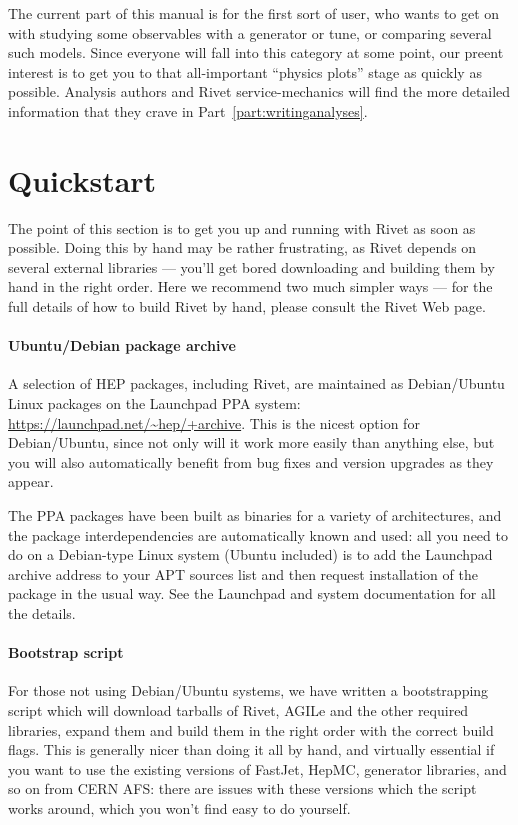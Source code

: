 \documentclass{JHEP3}
\begin{document}
The current part of this manual is for the first sort of user, who wants to get
on with studying some observables with a generator or tune, or comparing several
such models. Since everyone will fall into this category at some point, our
preent interest is to get you to that all-important ``physics plots'' stage as
quickly as possible. Analysis authors and Rivet service-mechanics will find the
more detailed information that they crave in Part~\ref{part:writinganalyses}.


\section{Quickstart}

The point of this section is to get you up and running with Rivet as soon as
possible. Doing this by hand may be rather frustrating, as Rivet depends on
several external libraries --- you'll get bored downloading and building them by
hand in the right order. Here we recommend two much simpler ways --- for the
full details of how to build Rivet by hand, please consult the Rivet Web page.


\paragraph{Ubuntu/Debian package archive}

A selection of HEP packages, including Rivet, are maintained as Debian/Ubuntu
Linux packages on the Launchpad PPA system:
\url{https://launchpad.net/~hep/+archive}. This is the nicest option for
Debian/Ubuntu, since not only will it work more easily than anything else, but
you will also automatically benefit from bug fixes and version upgrades as they
appear.

The PPA packages have been built as binaries for a variety of architectures, and
the package interdependencies are automatically known and used: all you need to
do on a Debian-type Linux system (Ubuntu included) is to add the Launchpad
archive address to your APT sources list and then request installation of the
 package in the usual way. See the Launchpad and system documentation
for all the details.


\paragraph{Bootstrap script}

For those not using Debian/Ubuntu systems, we have written a bootstrapping
script which will download tarballs of Rivet, AGILe and the other required
libraries, expand them and build them in the right order with the correct build
flags. This is generally nicer than doing it all by hand, and virtually
essential if you want to use the existing versions of FastJet, HepMC, generator
libraries, and so on from CERN AFS: there are issues with these versions which
the script works around, which you won't find easy to do yourself.
\end{document}
